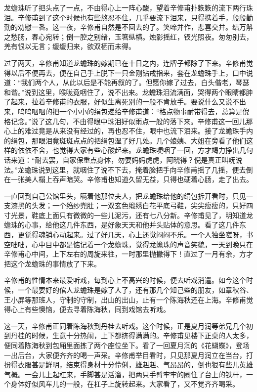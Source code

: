 \documentclass[12pt,UTF8]{ctexbook}
\begin{document}
{{{龙蟾珠听了把头点了一点，不由得心上一阵心酸，望着辛修甫扑簌簌的流下两行珠泪。辛修甫到了这个时候也有些熬忍不住，几乎要流下泪来，只得携着手，殷殷勤勤的劝慰一番。这一夜，辛修甫自然是不回去的了。笑啼并作，悲喜交并。结万斛之愁肠，春心宛转；倒一腔之别绪，玉箸纵横。烛影摇红，钗光照夜。匆匆别去，羌有恨以无言；缓缓归来，欲双栖而未得。

过了两天，辛修甫知道龙蟾珠的嫁期已在十日之内，连牌子都除了下来。辛修甫觉得以后不便再去，便在自己手上脱下一只金刚钻戒指来，套在龙蟾珠手上，口中说道：“我们两个人，从此以后是不能再叙的了。但愿你嫁了过去，白头偕老，琴瑟和谐。”说到这里，喉咙竟咽住了，说不出来。龙蟾珠泪流满面，哭得两个眼睛都肿了起来，拉着辛修甫的衣服，好似生离死别的一般不肯放手。要说什么又说不出来，呜呜咽咽的把一个小小的绢包递给辛修甫道：“格点物事耐带得去，总算是倪格记念。”说了这几句，不由得眼中珠泪好似雨点一般的落下来。辛修甫这一回儿那心上的难过竟是从来没有经过的，再也忍不住，眼中也流下泪来。接了龙蟾珠手内的绢包，那眼泪竟斑斑点点的把绢包湿了好几处。几个娘姨、大姐在旁看了他们这样的依依不舍，也觉得大家有些心酸起来。龙蟾珠哽咽了一回，方才竭力挣出几句话来道：“耐去罢，自家保重点身体，勿要妈妈虎虎，阿晓得？倪是真正叫呒说法。”龙蟾珠说到这里，就咽住了说不下去，掩着脸把手向辛修甫摇了几摇，便去倒在一张美人榻上吞声暗哭。辛修甫也知道久留无益，只得也硬着心肠，走了出去。

一直回到自己公馆里头，瞒着他那位夫人，把龙蟾珠给他的绢包拆开看时，只见一支漆黑的头发；一个绉纱兜肚；一双玄色缎绣白花平底弓鞋，尖尖瘦瘦的，只好四寸光景，鞋底上面只有微微的一些儿泥污，还有七八分新。辛修甫见了，明知道龙蟾珠的心事，给他这几件东西，是好象天天和他并头贴体的意思。看了这几件东西，更觉得魂销心动起来。过了好几天，心上还觉闷闷不乐。一个人独坐嗟呀，书空咄咄，心中目中都是惦记着一个龙蟾珠，觉得龙蟾珠的声音笑貌，一天到晚只在辛修甫心中间，上下左右的周旋来往，一时那里抛撇得下！直过了一月有余，方才把这个龙蟾珠的事情放了下来。

辛修甫的性情本来最爱听戏，每到心上不高兴的时候，便去听戏消遣。如今这个时候，一个最要好的倌人龙蟾珠是嫁了人了，还有那几个知己些的朋友，如章秋谷、王小屏等那班人，守制的守制，出山的出山，止有一个陈海秋还在上海。辛修甫觉得心上有些懊恼，便去寻着陈海秋，同到戏馆去听戏。

这一天，辛修甫正同着陈海秋到丹桂去听戏。这个时候，正是夏月润等弟兄几个初到丹桂的时候，生意十分热闹，上下都挤得满满的。辛修甫见楼下正桌的人太多，便同着陈海秋到包厢里面拣了两个座位坐下。看了一回夏月润的《花蝴蝶》，登场一出后台，大家便齐齐的喝一声采。辛修甫举目看时，只见那夏月润立在当台，打扮得衣服甚是鲜明，结束得身材十分伶俐，雄赳赳、气昂昂的，倒也狠有些儿英雄气概。一会儿上起杠来，手脚甚是活溜，把两只手臂牢牢的圈住了台上的铁杆，一个身体好似风车儿的一般，在杠子上旋转起来。大家看了，又不觉齐齐喝采。

}}}
\end{document}
